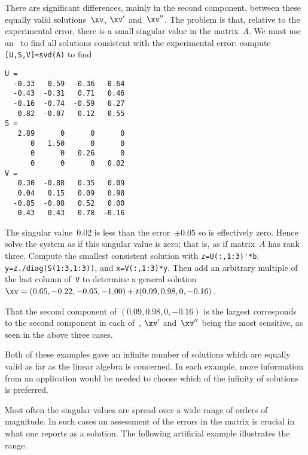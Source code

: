 \begin{example}
\begin{enumerate}
\begin{solution}
\begin{itemize}
\end{itemize}
There are significant differences, mainly in the second component, between these equally valid solutions~\(\xv\), \(\xv'\) and~\(\xv''\).
The problem is that, relative to the experimental error, there is a small singular value in the matrix~\(A\).
We must use an \svd\ to find all solutions consistent with the experimental error: compute \verb|[U,S,V]=svd(A)| to find \twodp
\begin{verbatim}
U =
  -0.33   0.59  -0.36   0.64
  -0.43  -0.31   0.71   0.46
  -0.16  -0.74  -0.59   0.27
   0.82  -0.07   0.12   0.55
S =
   2.89      0      0      0
      0   1.50      0      0
      0      0   0.26      0
      0      0      0   0.02
V =
   0.30  -0.88   0.35   0.09
   0.04   0.15   0.09   0.98
  -0.85  -0.08   0.52   0.00
   0.43   0.43   0.78  -0.16
\end{verbatim}
The singular value~\(0.02\) is less than the error~\(\pm0.05\) so is effectively zero.
Hence solve the system as if this singular value is zero; that is, as if matrix~\(A\) has rank three.
Compute the smallest consistent solution with \verb|z=U(:,1:3)'*b|, \verb|y=z./diag(S(1:3,1:3))|, and \verb|x=V(:,1:3)*y|.
Then add an arbitrary multiple of the last column of~\verb|V| to determine a general solution 
\(\xv=(0.65,-0.22,-0.65,-1.00)+t(0.09,0.98,0,-0.16)\).

That the second component of \((0.09,0.98,0,-0.16)\) is the largest corresponds to the second component in each of~\xv, \(\xv'\) and~\(\xv''\) being the most sensitive, as seen in the above three cases.
\end{solution}
\end{enumerate}

Both of these examples gave an infinite number of solutions which are equally valid as far as the linear algebra is concerned.
In each example, more information from an application would be needed to choose which of the infinity of solutions is preferred.
\end{example}


Most often the singular values are spread over a wide range of orders of magnitude.
In such cases an assessment of the errors in the matrix is crucial in what one reports as a solution.
The following artificial example illustrates the range.

